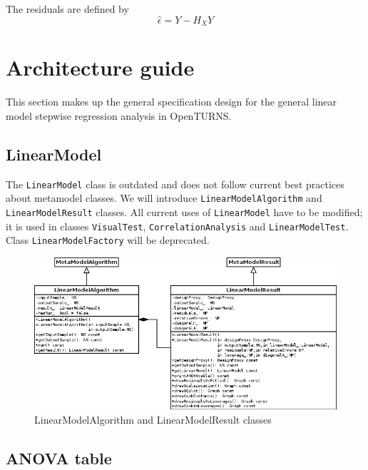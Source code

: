 The residuals are defined by
\begin{equation}
\hat{\epsilon} = Y - H_X Y
\end{equation}

\section{Architecture guide}

This section makes up the general specification design for the general linear model stepwise regression analysis
in OpenTURNS.

\subsection{LinearModel}

The \texttt{LinearModel} class is outdated and does not follow current best practices about metamodel classes.
We will introduce \texttt{LinearModelAlgorithm} and \texttt{LinearModelResult} classes.
All current uses of \texttt{LinearModel} have to be modified; it is used in classes \texttt{VisualTest},
\texttt{CorrelationAnalysis} and \texttt{LinearModelTest}. Class \texttt{LinearModelFactory} will be deprecated.

\begin{figure}[htb]
  \begin{center}
    \includegraphics[scale=0.5]{LinearModelAlgorithm.png}
    \caption{LinearModelAlgorithm and LinearModelResult classes}\label{fig:archi:LinearModelAlgorithm}
  \end{center}
\end{figure}

\subsection{ANOVA table}

